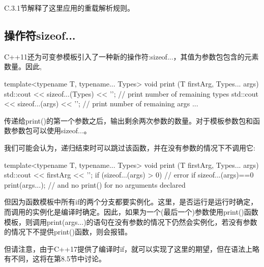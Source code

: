 C.3.1节解释了这里应用的重载解析规则。

\subsection{操作符sizeof...}

C++11还为可变参模板引入了一种新的操作符:sizeof...，其值为参数包包含的元素数量。因此,

\begin{cpp}
template<typename T, typename... Types>
void print (T firstArg, Types... args)
{
	std::cout << sizeof...(Types) << '\n'; // print number of remaining types
	std::cout << sizeof...(args) << '\n'; // print number of remaining args
	...
}
\end{cpp}

传递给print()的第一个参数之后，输出剩余两次参数的数量。对于模板参数包和函数参数包可以使用sizeof...。

我们可能会认为，递归结束时可以跳过该函数，并在没有参数的情况下不调用它:

\begin{cpp}
template<typename T, typename... Types>
void print (T firstArg, Types... args)
{
	std::cout << firstArg << '\n';
	if (sizeof...(args) > 0) { // error if sizeof...(args)==0
		print(args...); // and no print() for no arguments declared
	}
}
\end{cpp}

但因为函数模板中所有if的两个分支都要实例化。这里，是否运行是运行时确定，而调用的实例化是编译时确定。因此，如果为一个(最后一个)参数使用print()函数模板，则调用print(args...)的语句在没有参数的情况下仍然会实例化，若没有参数的情况下不提供print()函数，则会报错。

但请注意，由于C++17提供了编译时if，就可以实现了这里的期望，但在语法上略有不同，这将在第8.5节中讨论。
























